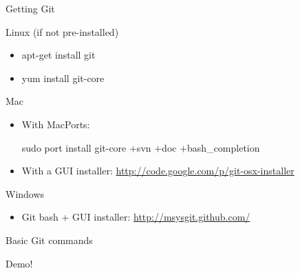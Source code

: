 \documentclass[xcolor=dvipsnames]{beamer}
\begin{document}
\begin{frame}{Getting Git}

{\LARGE Linux} (if not pre-installed)
\begin{itemize}
\item \begin{semiverbatim} apt-get install git \end{semiverbatim}
\item \begin{semiverbatim} yum install git-core \end{semiverbatim}
\end{itemize}

\vspace{2mm}
{\LARGE Mac}
\begin{itemize}
\item With MacPorts: \begin{semiverbatim} sudo port install git-core +svn +doc +bash{\_}completion \end{semiverbatim}
\item With a GUI installer: \url{http://code.google.com/p/git-osx-installer}
\end{itemize}

\vspace{2mm}
{\LARGE Windows}
\begin{itemize}
\item Git bash + GUI installer: \url{http://msysgit.github.com/}
\end{itemize}

\end{frame}

\begin{frame}{Basic Git commands}

\begin{center}
{\huge Demo!}
\end{center}

\end{frame}
\end{document}
